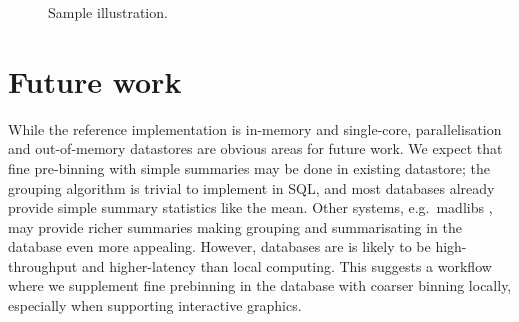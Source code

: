 \documentclass[journal]{vgtc}                %
\begin{document}
% 

\begin{figure}[htb]
 \centering
 \caption{Sample illustration.}
\end{figure}

\section{Future work}
\label{sec:conclusion}

While the reference implementation is in-memory and single-core, parallelisation and out-of-memory datastores are obvious areas for future work. We expect that fine pre-binning with simple summaries may be done in existing datastore; the grouping algorithm is trivial to implement in SQL, and most databases already provide simple summary statistics like the mean. Other systems, e.g.\ madlibs \citep{hellerstein:2012}, may provide richer summaries making grouping and summarisating in the database even more appealing. However, databases are is likely to be high-throughput and higher-latency than local computing. This suggests a workflow where we supplement fine prebinning in the database with coarser binning locally, especially when supporting interactive graphics.
\end{document}
